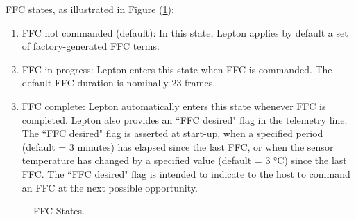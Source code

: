 FFC states, as illustrated in Figure (\ref{fig:FFC States}): \begin{enumerate}
\item FFC not commanded (default): In this state, Lepton applies by default a
set of factory-generated FFC terms. \item FFC in progress: Lepton enters this
state when FFC is commanded. The default FFC duration is nominally $23$ frames.
\item FFC complete: Lepton automatically enters this state whenever FFC is
completed. Lepton also provides an ``FFC desired" flag in the telemetry line.
The ``FFC desired" flag is asserted at start-up, when a specified period
(default = 3 minutes) has elapsed since the last FFC, or when the sensor
temperature has changed by a specified value (default = 3 \si{\celsius}) since
the last FFC. The ``FFC desired" flag is intended to indicate to the host to
command an FFC at the next possible opportunity.
\end{enumerate}
%
\begin{figure}[htb]
    \centering
    \resizebox{0.35\textwidth}{!}{}
    \caption{FFC States.}
    \label{fig:FFC States}
\end{figure}
%
\pagebreak
